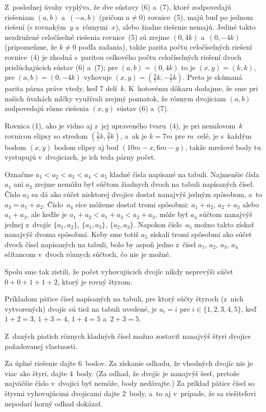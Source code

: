 {Z~poslednej úvahy vyplýva, že dve sústavy (6) a~(7), ktoré zodpovedajú  riešeniam
$(a,b)$ a~$({-a}, b)$ (pričom $a\ne0$) rovnice~(5), majú buď po jednom riešení
(s rovnakým~$y$ a~rôznymi~$x$), alebo žiadne riešenie nemajú. Jediné takto nezdružené
celočíselné riešenia rovnice~(5) sú zrejme $(0, 4k)$ a~$(0,{-4k})$ (pripomeňme,
že $k\ne0$ podľa zadania), takže parita počtu celočíselných riešení rovnice~(4)
je zhodná s~paritou celkového počtu celočíselných riešení dvoch prislúchajúcich
sústav (6) a~(7); pre $(a,b)=(0,4k)$ to je $(x,y)=(k,k)$, pre $(a,b)=(0,{-4k})$
vyhovuje $(x,y)=(\frac37 k,{-\frac17} k)$. Preto je skúmaná parita párna
práve vtedy, keď 7 delí~$k$. K~hotovému dôkazu dodajme, že sme pri našich úvahách
mlčky využívali zrejmý poznatok, že rôznym dvojiciam $(a,b)$ zodpovedajú rôzne
riešenia $(x,y)$ sústav (6) a~(7).

\poznamka
Rovnica (1), ako je vidno aj z~jej upraveného tvaru~(4),
je pri nenulovom~$k$ rovnicou elipsy
so stredom $(\frac57k,\frac37k)$, a~ak je $k= 7m$ pre $m$~celé, je s~každým bodom
$(x, y)$ bodom elipsy aj bod $(10m - x, 6m - y)$, takže mrežové body tu
vystupujú v~dvojiciach, je ich teda párny počet.
}

{%
Označme $a_1<a_2<a_3<a_4<a_5$ kladné čísla napísané na tabuli.
Najmenšie čísla $a_1$ ani $a_2$ zrejme nemôžu byť súčtom
žiadnych dvoch na tabuli napísaných čísel. Číslo $a_3$ sa dá ako
súčet niektorej dvojice dostať nanajvýš jedným spôsobom, a~to $a_3=a_1+a_2$.
Číslo~$a_4$ síce môžeme dostať tromi spôsobmi: $a_1+a_2$,
$a_2+a_3$ alebo $a_1+a_3$, ale keďže je $a_1+a_2<a_1+a_3<a_2+a_3$,
môže byť $a_4$ súčtom nanajvýš jednej z~dvojíc
$\{a_1,a_2\}$, $\{a_1,a_3\}$, $\{a_2,a_3\}$. Napokon
číslo~$a_5$ možno takto získať nanajvýš dvoma spôsobmi. Keby sme totiž
$a_5$ získali tromi spôsobmi ako súčet dvoch čísel napísaných na tabuli,
bolo by aspoň jedno z~čísel $a_1$, $a_2$, $a_3$, $a_4$ sčítancom
v~dvoch rôznych súčtoch, čo nie je možné.

Spolu sme tak zistili, že počet vyhovujúcich dvojíc
nikdy neprevýši súčet $0+0+1+1+2$, ktorý je rovný štyrom.

Príkladom pätice čísel napísaných na tabuli, pre ktorý súčty štyroch (z~nich
vytvorených) dvojíc sú tiež na tabuli uvedené, je $a_i=i$ pre
$i\in\{1, 2, 3, 4, 5\}$, keď $1+2=3$, $1+3=4$, $1+4=5$ a~$2+3=5$.

\zaver
Z~daných piatich rôznych kladných čísel možno zostaviť nanajvýš štyri dvojice
požadovanej vlastnosti.


\nobreak\medskip\petit\noindent
Za úplné riešenie dajte 6~bodov.
Za získanie odhadu, že vhodných dvojíc nie je viac ako štyri, dajte 4~body.
(Za odhad, že dvojíc je nanajvýš šesť, pretože najväčšie číslo v~dvojici
byť nemôže, body nedávajte.)
Za príklad pätice čísel so štyrmi vyhovujúcimi dvojicami dajte 2~body,
a~to aj v~prípade, že sa riešiteľovi nepodarí horný odhad dokázať.

\endpetit
\bigbreak}

